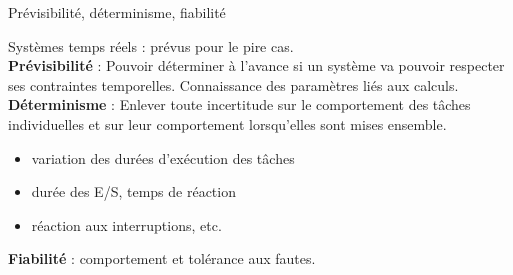 %
%
%
%
%


\begin{frame}{Prévisibilité, déterminisme, fiabilité}

  Systèmes temps réels : prévus pour le pire cas.\\[3mm]

  \textbf{Prévisibilité} : Pouvoir déterminer à l'avance si un système
  va pouvoir  respecter ses contraintes  temporelles. Connaissance des
  paramètres liés  aux calculs.\\[3mm]

  \textbf{Déterminisme}   :   Enlever   toute   incertitude   sur   le
  comportement  des  tâches  individuelles  et sur  leur  comportement
  lorsqu'elles sont mises ensemble.
  \begin{itemize}
  \item variation des durées d'exécution des tâches
  \item durée des E/S, temps de réaction
  \item réaction aux interruptions, etc.
  \end{itemize}

  \textbf{Fiabilité} : comportement et tolérance aux fautes.
\end{frame}

